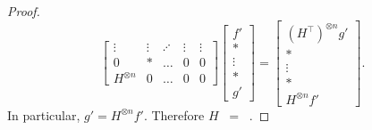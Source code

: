 \documentclass{article}
\theoremstyle{remark}
\theoremstyle{definition}
\DeclareMathOperator{\fc}{\mathcal{F}}
\DeclareMathOperator{\gc}{\mathcal{G}}
\DeclareMathOperator{\ofc}{\overline{\fc}}
\DeclareMathOperator{\ogc}{\overline{\gc}}
\begin{document}
\begin{proof}
\[\begin{bmatrix}
            \vdots & \vdots & \iddots & \vdots & \vdots \\
            0 & * & \ldots & 0 & 0\\
            H^{\otimes n} & 0 & \ldots & 0 & 0
        \end{bmatrix}
        \begin{bmatrix} 
            f' \\ * \\ \vdots \\ * \\ g'
        \end{bmatrix}
        =
        \begin{bmatrix} 
            (H^\top)^{\otimes n} g' \\ * \\ \vdots \\ * \\ H^{\otimes n} f'
        \end{bmatrix}.
    \]
    In particular, $g' = H^{\otimes n}f'$. Therefore $H\ofc = \ogc$.
\end{proof}
\end{document}
